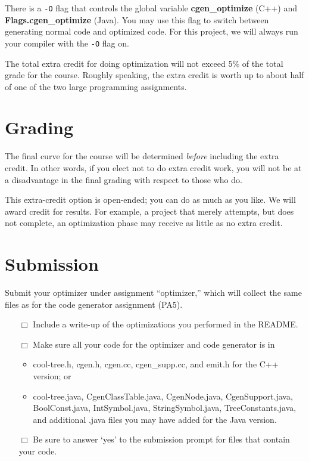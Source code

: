 \documentclass[11pt]{article}
\def\U#1{{\sf{}#1}}
\def\C#1{{\bf{}#1}}
\begin{document}
There is a {\tt -O} flag that controls the global variable
\C{cgen\_optimize} (C++) and \C{Flags.cgen\_optimize} (Java).  You may
use this flag to switch between generating normal code and optimized
code.  For this project, we will always run your compiler with the
{\tt -O} flag on.

The total extra credit for doing optimization will not exceed 5\% of
the total grade for the course.  Roughly speaking, the extra credit is
worth up to about half of one of the two large programming
assignments.

\section{Grading}

The final curve for the course will be determined {\em before}
including the extra credit.  In other words, if you elect not to do
extra credit work, you will not be at a disadvantage in the final
grading with respect to those who do.

This extra-credit option is open-ended; you can do as much as you
like.  We will award credit for results. For example, a project that
merely attempts, but does not complete, an optimization phase may
receive as little as no extra credit.

\section{Submission}

Submit your optimizer under assignment ``optimizer,'' which will
collect the same files as for the code generator assignment (PA5).

\begin{minipage}{0.8\linewidth}
\bigskip
\begin{itemize}
  \item[$\Box$]
    Include a write-up of the optimizations you performed in the \U{README}.

  \item[$\Box$]
    Make sure all your code for the optimizer and code generator is in
    \begin{itemize}
    \item \U{cool-tree.h}, \U{cgen.h},
          \U{cgen.cc}, \U{cgen\_supp.cc}, and \U{emit.h} for the
          C++ version; or
    \item \U{cool-tree.java}, \U{CgenClassTable.java},
          \U{CgenNode.java}, \U{CgenSupport.java}, \U{BoolConst.java},
          \U{IntSymbol.java}, \U{StringSymbol.java},
          \U{TreeConstants.java}, and additional \U{.java} files you
          may have added for the Java version.
    \end{itemize}

  \item[$\Box$]
    Be sure to answer `yes' to the submission prompt for files that contain
    your code.
\end{itemize}
\end{minipage}
\end{document}
